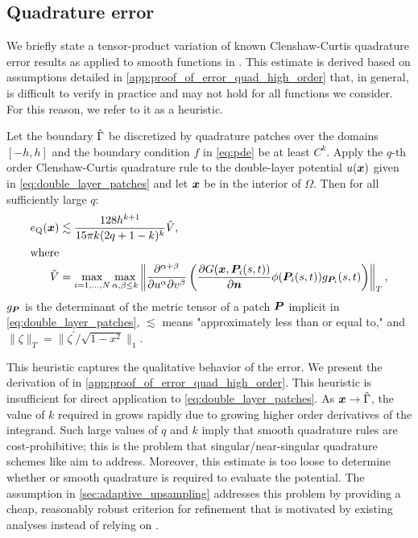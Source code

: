 \subsection{Quadrature error\label{sec:quad_error}}
We briefly state a tensor-product variation of known Clenshaw-Curtis quadrature error results as applied to smooth functions in \threed.  
This estimate is derived based on assumptions detailed in \cref{app:proof_of_error_quad_high_order} that, in general, is difficult to verify in practice and may not hold for all functions we consider.
For this reason, we refer to it as a heuristic.

\begin{heuristic}
    Let the boundary $\hat{\Gamma}$ be discretized by quadrature patches over the domains $[-h,h]$ and the boundary condition $f$ in \cref{eq:pde} be at least $C^k$.
  Apply the $q$-th order Clenshaw-Curtis quadrature rule to the double-layer potential $u({\bm{x}})$ given in \cref{eq:double_layer_patches} and let ${\bm{x}}$ be in the interior of $\Omega$. 
  Then for all sufficiently large $q$:
\begin{align}
  e_\lbl{Q}(\vx) &%
  \lesssim  \frac{128h^{k+1}}{15\pi k(2q + 1 - k)^{k}} \tilde{V}, \\ 
  \shortintertext{where}
  \tilde{V} &= \max_{i=1,\hdots,N} \max_{\alpha,\beta\leq k}\left\| \frac{\partial^{\alpha+\beta}}{\partial u^\alpha\partial v^\beta}\left(\frac{\partial G(\vx,\vP_i(s,t))}{\partial \vn}\phi(\vP_i(s,t)) g_{\vP_i}(s,t)\right)\right\|_T,
  \label{eq:error_quad_gen_target}
\end{align}
 $g_{\bm{P}}$ is the determinant of the metric tensor of a patch ${\bm{P}}$ implicit in \cref{eq:double_layer_patches}, $\lesssim$ means "approximately less than or equal to," and $\|\zeta\|_T = \|\zeta^\prime/\sqrt{1-x^2}\|_1$.
  \label{heuristic:error_quad_high_order}
\end{heuristic}

This heuristic captures the qualitative behavior of the error. 
We present the derivation of  in \cref{app:proof_of_error_quad_high_order}.
This heuristic is  insufficient for direct application to \cref{eq:double_layer_patches}. 
As ${\bm{x}} \to \hat{\Gamma}$, the value of $k$ required in  grows rapidly due to growing higher order derivatives of the integrand. 
Such large values of $q$ and $k$ imply that smooth quadrature rules are cost-prohibitive; this is the problem that singular/near-singular quadrature schemes like \qbkix aim to address.
Moreover, this estimate is too loose to determine whether \qbkix or smooth quadrature is required to evaluate the potential.
The assumption in \cref{sec:adaptive_upsampling} addresses this problem by providing a cheap, reasonably robust criterion for refinement that is motivated by existing analyses \cite{aT2,barnett2014evaluation} instead of relying on .



